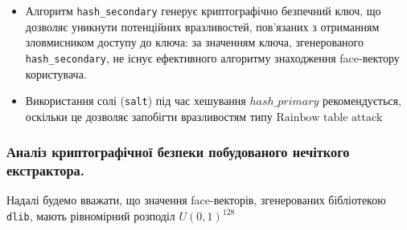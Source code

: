 \documentclass[11pt]{article}
\providecommand{\tightlist}{%
      \setlength{\itemsep}{0pt}\setlength{\parskip}{0pt}}
\begin{document}
\begin{itemize}
\begin{itemize}
    \begin{itemize}
    \tightlist
    \item
      Алгоритм \texttt{hash\_secondary} генерує криптографічно безпечний
      ключ, що дозволяє уникнути потенційних вразливостей, пов'язаних з
      отриманням зловмисником доступу до ключа: за значенням ключа,
      згенерованого \texttt{hash\_secondary}, не існує ефективного
      алгоритму знаходження face-вектору користувача.
    \item
      Використання солі (\texttt{salt}) під час хешування
      \(hash\_primary\) рекомендується, оскільки це дозволяє
      запобігти вразливостям типу \(\text{Rainbow table attack}\)
    \end{itemize}
  \end{itemize}
\end{itemize}

\vspace{25ex}

    \hypertarget{ux430ux43dux430ux43bux456ux437-ux43aux440ux438ux43fux442ux43eux433ux440ux430ux444ux456ux447ux43dux43eux457-ux431ux435ux437ux43fux435ux43aux438-ux43fux43eux431ux443ux434ux43eux432ux430ux43dux43eux433ux43e-ux43dux435ux447ux456ux442ux43aux43eux433ux43e-ux435ux43aux441ux442ux440ux430ux43aux442ux43eux440ux430.}{%
\subsubsection{Аналіз криптографічної безпеки побудованого нечіткого
екстрактора.}\label{ux430ux43dux430ux43bux456ux437-ux43aux440ux438ux43fux442ux43eux433ux440ux430ux444ux456ux447ux43dux43eux457-ux431ux435ux437ux43fux435ux43aux438-ux43fux43eux431ux443ux434ux43eux432ux430ux43dux43eux433ux43e-ux43dux435ux447ux456ux442ux43aux43eux433ux43e-ux435ux43aux441ux442ux440ux430ux43aux442ux43eux440ux430.}}

Надалі будемо вважати, що значення face-векторів, згенерованих
бібліотекою \texttt{dlib}, мають рівномірний розподіл \(U(0,1)^{128}\)
\end{document}

